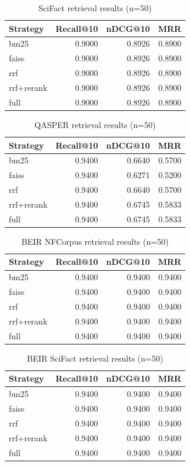 \begin{table}[h]
\centering
\begin{tabular}{lrrr}
\toprule
Strategy & Recall@10 & nDCG@10 & MRR \\
\midrule
bm25 & 0.9000 & 0.8926 & 0.8900 \\
faiss & 0.9000 & 0.8926 & 0.8900 \\
rrf & 0.9000 & 0.8926 & 0.8900 \\
rrf+rerank & 0.9000 & 0.8926 & 0.8900 \\
full & 0.9000 & 0.8926 & 0.8900 \\
\bottomrule
\end{tabular}
\caption{SciFact retrieval results (n=50)}
\end{table}

\begin{table}[h]
\centering
\begin{tabular}{lrrr}
\toprule
Strategy & Recall@10 & nDCG@10 & MRR \\
\midrule
bm25 & 0.9400 & 0.6640 & 0.5700 \\
faiss & 0.9400 & 0.6271 & 0.5200 \\
rrf & 0.9400 & 0.6640 & 0.5700 \\
rrf+rerank & 0.9400 & 0.6745 & 0.5833 \\
full & 0.9400 & 0.6745 & 0.5833 \\
\bottomrule
\end{tabular}
\caption{QASPER retrieval results (n=50)}
\end{table}

\begin{table}[h]
\centering
\begin{tabular}{lrrr}
\toprule
Strategy & Recall@10 & nDCG@10 & MRR \\
\midrule
bm25 & 0.9400 & 0.9400 & 0.9400 \\
faiss & 0.9400 & 0.9400 & 0.9400 \\
rrf & 0.9400 & 0.9400 & 0.9400 \\
rrf+rerank & 0.9400 & 0.9400 & 0.9400 \\
full & 0.9400 & 0.9400 & 0.9400 \\
\bottomrule
\end{tabular}
\caption{BEIR NFCorpus retrieval results (n=50)}
\end{table}

\begin{table}[h]
\centering
\begin{tabular}{lrrr}
\toprule
Strategy & Recall@10 & nDCG@10 & MRR \\
\midrule
bm25 & 0.9400 & 0.9400 & 0.9400 \\
faiss & 0.9400 & 0.9400 & 0.9400 \\
rrf & 0.9400 & 0.9400 & 0.9400 \\
rrf+rerank & 0.9400 & 0.9400 & 0.9400 \\
full & 0.9400 & 0.9400 & 0.9400 \\
\bottomrule
\end{tabular}
\caption{BEIR SciFact retrieval results (n=50)}
\end{table}
